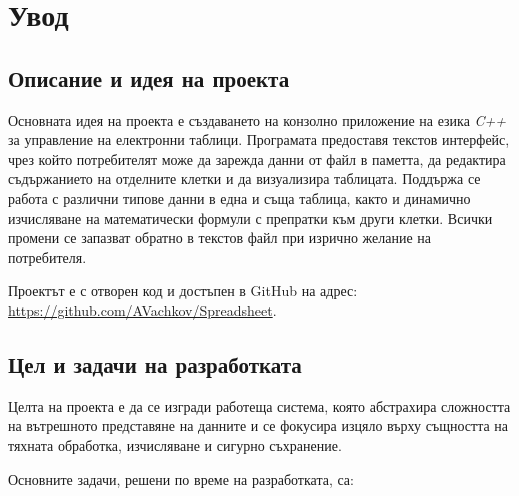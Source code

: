 \chapter{Увод}

\section{Описание и идея на проекта}
Основната идея на проекта е създаването на конзолно приложение на езика \textit{C++} за управление на електронни таблици. Програмата предоставя текстов интерфейс, чрез който потребителят може да зарежда данни от файл в паметта, да редактира съдържанието на отделните клетки и да визуализира таблицата. Поддържа се работа с различни типове данни в една и съща таблица, както и динамично изчисляване на математически формули с препратки към други клетки. Всички промени се запазват обратно в текстов файл при изрично желание на потребителя.

Проектът е с отворен код и достъпен в GitHub на адрес: \\ \url{https://github.com/AVachkov/Spreadsheet}.

\section{Цел и задачи на разработката}

Целта на проекта е да се изгради работеща система, която абстрахира сложността на вътрешното представяне на данните и се фокусира изцяло върху същността на тяхната обработка, изчисляване и сигурно съхранение.

Основните задачи, решени по време на разработката, са:

